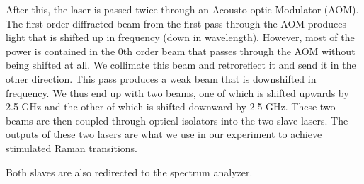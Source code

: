 After this, the laser is passed twice through an Acousto-optic Modulator (AOM). The first-order diffracted beam from the first pass through the AOM produces light that is shifted up in frequency (down in wavelength). However, most of the power is contained in the 0th order beam that passes through the AOM without being shifted at all. We collimate this beam and retroreflect it and send it in the other direction. This pass produces a weak beam that is downshifted in frequency. We thus end up with two beams, one of which is shifted upwards by 2.5 GHz and the other of which is shifted downward by 2.5 GHz. These two beams are then coupled through optical isolators into the two slave lasers. The outputs of these two lasers are what we use in our experiment to achieve stimulated Raman transitions. 


Both slaves are also redirected to the spectrum analyzer. 
